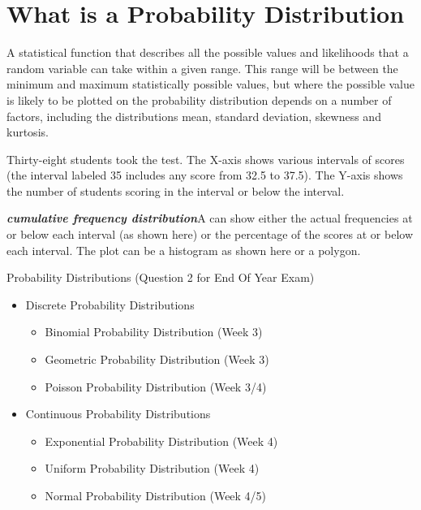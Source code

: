 \documentclass[12pt]{report}
\begin{document}
{{\section{What is a Probability Distribution}

A statistical function that describes all the possible values and likelihoods that a random variable can take within a given range. This range will be between the minimum and maximum statistically possible values, but where the possible value is likely to be plotted on the probability distribution depends on a number of factors, including the distributions mean, standard deviation, skewness and kurtosis.
	


{ \Large
	Thirty-eight students took the test. The X-axis shows various intervals of scores (the interval labeled 35 includes any score from 32.5 to 37.5). The Y-axis shows the number of students scoring in the interval or below the interval.
	
	\textbf{\emph{cumulative frequency distribution}}A  can show either the actual frequencies at or below each interval (as shown here) or the percentage of the scores at or below each interval. The plot can be a histogram as shown here or a polygon.
}

{\LARGE
	Probability Distributions (Question 2 for End Of Year Exam)
	\begin{itemize}
		\item Discrete Probability Distributions
		\begin{itemize}
			\item Binomial Probability Distribution (Week 3)
			\item Geometric Probability Distribution (Week 3)
			\item Poisson Probability Distribution (Week 3/4)
		\end{itemize}
		
		\item Continuous Probability Distributions
		\begin{itemize}
			\item Exponential Probability Distribution (Week 4)
			\item Uniform Probability Distribution (Week 4)
			\item Normal Probability Distribution (Week 4/5)
		\end{itemize}
	\end{itemize}
}



}}
\end{document}
